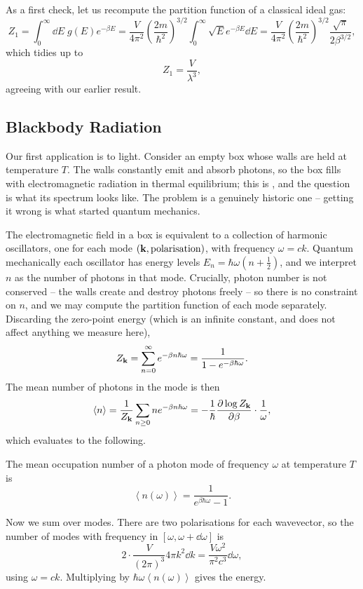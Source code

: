 \documentclass[a4paper]{scrartcl}
\newcommand{\avg}[1]{\left\langle #1 \right\rangle}
\begin{document}
As a first check, let us recompute the partition function of a classical ideal gas:
$$
Z_1 = \int_0^\infty \dd E\; g(E) e^{-\beta E} = \frac{V}{4\pi^2}\left(\frac{2m}{\hbar^2}\right)^{3/2}\int_0^\infty \sqrt E e^{-\beta E}\dd E = \frac{V}{4\pi^2}\left(\frac{2m}{\hbar^2}\right)^{3/2}\frac{\sqrt\pi}{2\beta^{3/2}},
$$
which tidies up to
$$
Z_1 = \frac{V}{\lambda^3},
$$
agreeing with our earlier result.

\subsection{Blackbody Radiation}\label{sec:blackbody}

Our first application is to light. Consider an empty box whose walls are held at temperature $T$. The walls constantly emit and absorb photons, so the box fills with electromagnetic radiation in thermal equilibrium; this is , and the question is what its spectrum looks like. The problem is a genuinely historic one -- getting it wrong is what started quantum mechanics.

The electromagnetic field in a box is equivalent to a collection of harmonic oscillators, one for each mode $(\mathbf{k}, \text{polarisation})$, with frequency $\omega = ck$. Quantum mechanically each oscillator has energy levels $E_n = \hbar\omega(n+\tfrac 12)$, and we interpret $n$ as the number of photons in that mode. Crucially, photon number is not conserved -- the walls create and destroy photons freely -- so there is no constraint on $n$, and we may compute the partition function of each mode separately. Discarding the zero-point energy (which is an infinite constant, and does not affect anything we measure here),
$$
Z_{\mathbf{k}} = \sum_{n=0}^\infty e^{-\beta n \hbar\omega} = \frac{1}{1 - e^{-\beta\hbar\omega}}.
$$
The mean number of photons in the mode is then
$$
\avg n = \frac{1}{Z_{\vv k}}\sum_{n\ge 0} n e^{-\beta n\hbar\omega} = -\frac{1}{\hbar}\frac{\partial \log Z_{\vv k}}{\partial\beta}\cdot\frac{1}{\omega},
$$
which evaluates to the following.

\begin{definition}
	The mean occupation number of a photon mode of frequency $\omega$ at temperature $T$ is
	$$
	\avg{n(\omega)} = \frac{1}{e^{\beta\hbar\omega}-1}.
	$$
\end{definition}

Now we sum over modes. There are two polarisations for each wavevector, so the number of modes with frequency in $[\omega, \omega+\dd\omega]$ is
$$
2 \cdot \frac{V}{(2\pi)^3}4\pi k^2 \dd k = \frac{V\omega^2}{\pi^2 c^3}\dd\omega,
$$
using $\omega = ck$. Multiplying by $\hbar\omega \avg{n(\omega)}$ gives the energy.
\end{document}
